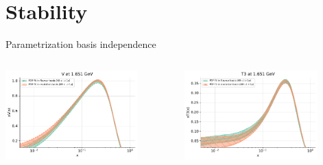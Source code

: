 \documentclass[aspectratio=169,9pt]{beamer}
\begin{document}
\section{Stability}
\begin{frame}{Parametrization basis independence}
    \begin{columns}
        \begin{column}[T]{0.48\textwidth}
        \vspace*{0pt}%
	        \begin{center}
	            \includegraphics[width=0.8\textwidth]{flavour_evolution_V} \\
	        \end{center}
        \end{column}
        \begin{column}[t]{0.48\textwidth}
        \vspace{0pt}%
	        \begin{center}
	            \includegraphics[width=0.8\textwidth]{flavour_evolution_T3} \\
	        \end{center}
        \end{column}

\end{columns}
\end{frame}
\end{document}
